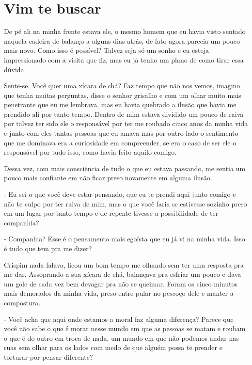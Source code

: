 
\newpage

\chapter{Vim te buscar}



De pé ali na minha frente estava ele, o mesmo homem que eu havia visto sentado naquela cadeira de balanço a alguns dias atrás, de fato agora parecia um pouco mais novo. Como isso é possível? Talvez seja só um sonho e eu esteja impressionado com a visita que fiz, mas eu já tenho um plano de como tirar essa dúvida.

Sente-se. Você quer uma xícara de chá? Faz tempo que não nos vemos, imagino que tenha muitas perguntas, disse o senhor grisalho e com um olhar muito mais penetrante que eu me lembrava, mas eu havia quebrado a ilusão que havia me prendido ali por tanto tempo. Dentro de mim estava dividido um pouco de raiva por talvez ter sido ele o responsável por ter me roubado cinco anos da minha vida e junto com eles tantas pessoas que eu amava mas por outro lado o sentimento que me dominava era a curiosidade em compreender, se era o caso de ser ele o responsável por tudo isso, como havia feito aquilo comigo.

Dessa vez, com mais consciência de tudo o que eu estava passando, me sentia um pouco mais confiante em não ficar preso novamente em alguma ilusão.

- Eu sei o que você deve estar pensando, que eu te prendi aqui junto comigo e não te culpo por ter raiva de mim, mas o que você faria se estivesse sozinho preso em um lugar por tanto tempo e de repente tivesse a possibilidade de ter companhia?

- Companhia? Esse é o pensamento mais egoísta que eu já vi na minha vida. Isso é tudo que tem pra me dizer?

Crispim nada falava, ficou um bom tempo me olhando sem ter uma resposta pra me dar. Assoprando a sua xícara de chá, balançava pra esfriar um pouco e dava um gole de cada vez bem devagar pra não se queimar. Foram os cinco minutos mais demorados da minha vida, preso entre pular no pescoço dele e manter a compostura.

- Você acha que aqui onde estamos a moral faz alguma diferença? Parece que você não sabe o que é morar nesse mundo em que as pessoas se matam e roubam o que é do outro em troca de nada, um mundo em que não podemos andar nas ruas sem olhar para os lados com medo de que alguém possa te prender e torturar por pensar diferente?


